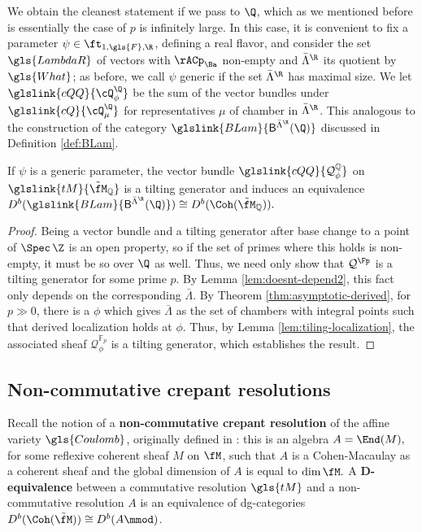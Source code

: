 We obtain the cleanest statement if we pass to $\Q$, which as we mentioned before is essentially the case of $p$ is infinitely large.  In this case, it is convenient to fix a parameter $\psi\in \ft_{1,\gls{F},\R}$, defining a real flavor, and consider the set $\gls{LambdaR}$ of vectors with $\rACp_{\Ba}$ non-empty and $\bar{\Lambda}^{\R}$ its quotient by $\gls{What}$; as before, we call $\psi$ generic if the set $\bar{\Lambda}^{\R}$ has maximal size.  We let $\glslink{cQQ}{\cQ^{\Q}_\phi}$ be the sum of the vector bundles under $\glslink{cQ}{\cQ^\Q_\mu}$ for representatives $\mu$ of chamber in $\bar{\Lambda}^{\R}$.  This analogous to the construction of the category $\glslink{BLam}{\mathsf{B}^{\bar{\Lambda}^{\R}}(\Q)}$ discussed in Definition \ref{def:BLam}. 
\begin{theorem}\label{th:Q-equiv}
  If $\psi$ is a generic parameter, the vector bundle $\glslink{cQQ}{\mathcal{Q}^{\mathbb{Q}}_\phi}$ on $\glslink{tM}{\tilde{\fM}_{\mathbb{Q}}}$ is a tilting generator and induces an equivalence $D^b(\glslink{BLam}{\mathsf{B}^{\bar{\Lambda}^{\R}}(\Q)})\cong D^b(\Coh(\tilde{\fM}_{\mathbb{Q}})).$
\end{theorem}
\begin{proof}
   Being a vector bundle and a tilting generator after base change to a point of $\Spec\,
   \Z$ is an open property, so if the set of primes where this holds
   is non-empty, it must be so over $\Q$ as well.  Thus, we need only
   show that $\mathcal{Q}^{\Fp}$ is a tilting generator for some
   prime $p$.  By Lemma \ref{lem:doesnt-depend2}, this fact only
   depends on the corresponding $\bar \Lambda$.  By Theorem
   \ref{thm:asymptotic-derived}, for $p\gg 0$, there is a $\phi$ which
   gives $\bar \Lambda$ as the set of chambers with integral points
   such that derived localization holds at $\phi$.  Thus, by Lemma
   \ref{lem:tiling-localization}, the associated sheaf
   $\mathcal{Q}^{\mathbb{F}_p}_\phi$ is a tilting generator, which
   establishes the result.
 \end{proof}

\subsection{Non-commutative crepant resolutions}
\label{sec:non-comm-crep}


Recall the notion of a {\bf non-commutative crepant resolution} of the affine variety $\gls{Coulomb}$, originally defined in \cite{vdB04}: this is an algebra $A=\End(M),$ for some reflexive coherent sheaf $M$ on $\fM$, such that $A$ is a Cohen-Macaulay as a coherent sheaf and the global dimension of $A$ is equal to $\dim \fM.$  A {\bf D-equivalence} between a commutative resolution $\gls{tM}$ and a non-commutative resolution $A$ is an equivalence of dg-categories $D^b(\Coh(\tilde{\fM}))\cong D^b(A\mmod)$.  

